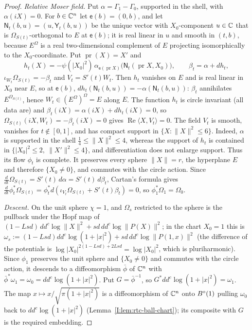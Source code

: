 \begin{proof}
\emph{Relative Moser field.} Put $\alpha=\Gamma_1-\Gamma_0$, supported in the shell, with $\alpha(iX)=0$. For $b\in\mathbb{C}^n$ let
$\mathsf e(b)=(0,b)$, and let $\mathsf N_t(b,u)=(u,\mathsf Y_t(b,u))$ be the unique vector with $X_0$-component $u\in\mathbb{C}$ that is
$\Omega_{S(t)}$-orthogonal to $E$ at $\mathsf e(b)$; it is real linear in $u$ and smooth in $(t,b)$, because $E^{\Omega}$ is a
real two-dimensional complement of $E$ projecting isomorphically to the $X_0$-coordinate. Put $\operatorname{pr}(X)=X'$ and
\[
 h_t(X)=-\psi(|X_0|^2)\,\alpha_{\mathsf e(\operatorname{pr}X)}\bigl(\mathsf N_t(\operatorname{pr}X,X_0)\bigr),\qquad \beta_t=\alpha+dh_t,
\]
$\iota_{W_t}\Omega_{S(t)}=-\beta_t$ and $V_t=S'(t)W_t$. Then $h_t$ vanishes on $E$ and is real linear in $X_0$ near $E$, so at
$\mathsf e(b)$, $dh_t(\mathsf N_t(b,u))=-\alpha(\mathsf N_t(b,u))$: $\beta_t$ annihilates $E^{\Omega_{S(t)}}$, hence
$W_t\in(E^{\Omega})^{\Omega}=E$ along $E$. The function $h_t$ is circle invariant (all data are) and $\beta_t(iX)=\alpha(iX)+dh_t(iX)=0$,
so $\Omega_{S(t)}(iX,W_t)=-\beta_t(iX)=0$ gives $\operatorname{Re}\langle X,V_t\rangle=0$. The field $V_t$ is smooth, vanishes for
$t\notin[0,1]$, and has compact support in $\{X:\|X\|^2\le6\}$. Indeed, $\alpha$ is supported in the shell
$\frac14\le\|X\|^2\le4$, whereas the support of $h_t$ is contained in
$\{|X_0|^2\le2,\ \|X'\|^2\le4\}$, and differentiation does not enlarge support. Thus its flow $\phi_t$ is
complete. It preserves every sphere $\|X\|=r$, the hyperplane $E$ and therefore $\{X_0\ne0\}$, and commutes with the circle
action. Since $\frac d{dt}\Omega_{S(t)}=S'(t)\,d\alpha=S'(t)\,d\beta_t$, Cartan's formula gives
$\frac d{dt}\phi_t^*\Omega_{S(t)}=\phi_t^*d(\iota_{V_t}\Omega_{S(t)}+S'(t)\beta_t)=0$, so $\phi_1^*\Omega_1=\Omega_0$.

\emph{Descent.} On the unit sphere $\chi=1$, and $\Omega_s$ restricted to the sphere is the pullback under the Hopf map of
$(1-Lsd)\,dd^c\log\|X\|^2+sd\,dd^c\log\|P(X)\|^2$; in the chart $X_0=1$ this is $\omega_s:=(1-Lsd)dd^c\log(1+|x|^2)+sd\,dd^c\log\|P(1,x)\|^2$
(the difference of the potentials is $\log|X_0|^{2(1-Lsd)+2Lsd}=\log|X_0|^2$, which is pluriharmonic). Since $\phi_1$ preserves the
unit sphere and $\{X_0\ne0\}$ and commutes with the circle action, it descends to a diffeomorphism $\bar\phi$ of $\mathbb{C}^n$ with
$\bar\phi^*\omega_1=\omega_0=dd^c\log(1+|x|^2)$. Put $G=\bar\phi^{-1}$, so $G^*dd^c\log(1+|x|^2)=\omega_1$. The map
$x\mapsto x/\sqrt{\pi(1+|x|^2)}$ is a diffeomorphism of $\mathbb{C}^n$ onto $B^{\circ}(1)$ pulling $\omega_0$ back to $dd^c\log(1+|x|^2)$
(Lemma~\ref{I:lem:rtc-ball-chart}); its composite with $G$ is the required embedding.
\end{proof}

